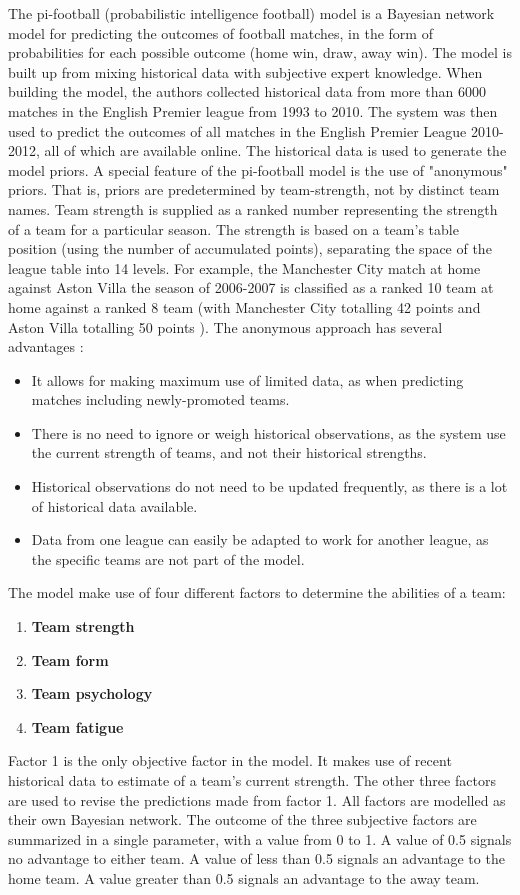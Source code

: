 The pi-football (probabilistic intelligence football) model \citep{bib:constantinou-fenton-neil-2012} is a Bayesian network model for predicting the outcomes of football matches, in the form of probabilities for each possible outcome (home win, draw, away win). The model is built up from mixing historical data with subjective expert knowledge. When building the model, the authors collected historical data from more than 6000 matches in the English Premier league from 1993 to 2010. The system was then used to predict the outcomes of all matches in the English Premier League 2010-2012, all of which are available online. The historical data is used to generate the model priors. A special feature of the pi-football model is the use of "anonymous" priors. That is, priors are predetermined by team-strength, not by distinct team names. Team strength is supplied as a ranked number representing the strength of a team for a particular season. The strength is based on a team's table position (using the number of accumulated points), separating the space of the league table into 14 levels. For example, the Manchester City match at home against Aston Villa the season of 2006-2007 is classified as a ranked 10 team at home against a ranked 8 team (with Manchester City totalling 42 points and Aston Villa totalling 50 points \citep{bib:constantinou-fenton-neil-2012}). The anonymous approach has several advantages \citep{bib:constantinou-fenton-neil-2012}:
\begin{itemize}
    \item It allows for making maximum use of limited data, as when predicting matches including newly-promoted teams.
    \item There is no need to ignore or weigh historical observations, as the system use the current strength of teams, and not their historical strengths.
    \item Historical observations do not need to be updated frequently, as there is a lot of historical data available.
    \item Data from one league can easily be adapted to work for another league, as the specific teams are not part of the model.
\end{itemize}

The model make use of four different factors to determine the abilities of a team:
\begin{enumerate}
    \item \textbf{Team strength}
    \item \textbf{Team form}
    \item \textbf{Team psychology}
    \item \textbf{Team fatigue}
\end{enumerate}
Factor 1 is the only objective factor in the model. It makes use of recent historical data to estimate of a team's current strength. The other three factors are used to revise the predictions made from factor 1. All factors are modelled as their own Bayesian network. The outcome of the three subjective factors are summarized in a single parameter, with a value from 0 to 1. A value of 0.5 signals no advantage to either team. A value of less than 0.5 signals an advantage to the home team. A value greater than 0.5 signals an advantage to the away team.

